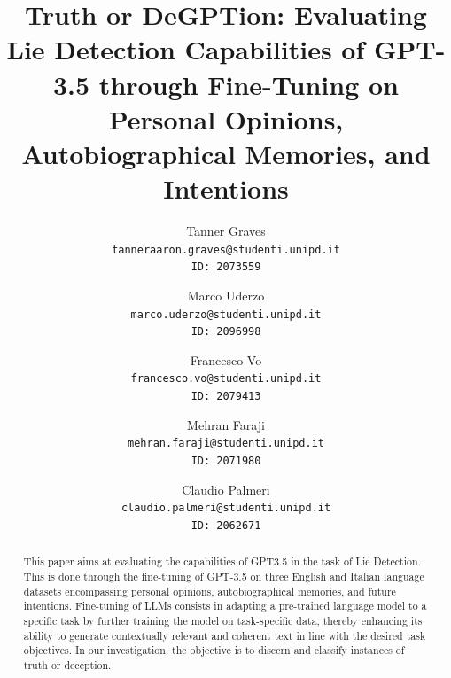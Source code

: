 \documentclass[10pt,twocolumn,letterpaper]{article}
\begin{document}
\title{Truth or DeGPTion: Evaluating Lie Detection Capabilities of GPT-3.5 through Fine-Tuning on Personal Opinions, Autobiographical Memories, and Intentions}


\author{
Tanner Graves\\
{\tt\small tanneraaron.graves@studenti.unipd.it} \\
{\tt\small ID: 2073559} \\
\and
Marco Uderzo\\
{\tt\small marco.uderzo@studenti.unipd.it} \\
{\tt\small ID: 2096998} \\
\and
Francesco Vo \\
{\tt\small francesco.vo@studenti.unipd.it} \\
{\tt\small ID: 2079413} \\
\and
Mehran Faraji\\
{\tt\small mehran.faraji@studenti.unipd.it} \\
{\tt\small ID: 2071980} \\
\and
Claudio Palmeri \\
{\tt\small claudio.palmeri@studenti.unipd.it} \\
{\tt\small ID: 2062671} \\
}

\maketitle


\begin{abstract}
This paper aims at evaluating the capabilities of GPT3.5 in the task of Lie Detection.
This is done through the fine-tuning of GPT-3.5 on three English and Italian language datasets encompassing 
personal opinions, autobiographical memories, and future intentions. 
Fine-tuning of LLMs consists in adapting a pre-trained language model to a specific 
task by further training the model on task-specific data, thereby 
enhancing its ability to generate contextually relevant and coherent text in 
line with the desired task objectives. In our investigation, the objective is to 
discern and classify instances of truth or deception.

\end{abstract}

\end{document}
